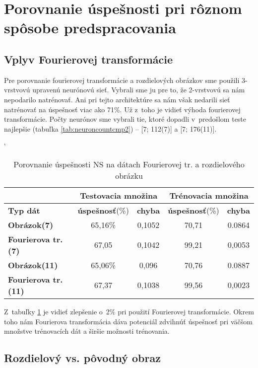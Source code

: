 \section{Porovnanie úspešnosti pri rôznom spôsobe predspracovania}

\subsection{Vplyv Fourierovej transformácie}

Pre porovnanie fourierovej transformácie a rozdielových obrázkov sme použili 3-vrstvovú upravenú neurónovú sieť. Vybrali sme ju pre to, že 2-vrstvovú sa nám nepodarilo natrénovať. Ani pri tejto architektúre sa nám však nedarili sieť natrénovať na úspešnosť viac ako 71\%. Už z~toho je vidieť výhoda fourierovej transformácie. Počty neurónov sme vybrali tie, ktoré dopadli v~predošlom teste najlepšie (tabuľka \ref{tab:neuroncountcmp2}) -- [7; 112(7)] a [7; 176(11)].

\begin{table}[htp]
\catcode` %
\centering
\begin{tabular}{|l|c|c|c|c|}
\cline{2-5}
\multicolumn{1}{l}{} & \multicolumn{2}{|c|}{\textbf{Testovacia množina}} & \multicolumn{2}{c|}{\textbf{Trénovacia množina}}\\ 
\hline
\textbf{Typ dát} & \textbf{úspešnosť}(\%) & \textbf{chyba} & \textbf{úspešnosť}(\%) & \textbf{chyba}\\ \hline
\textbf{Obrázok(7)} & 65,16\% & 0,1052 & 70,71 & 0.0864 \\ \hline
\textbf{Fourierova tr.(7)} & 67,05 & 0,1042 & 99,21 & 0,0053 \\ \hline 
\textbf{Obrázok(11)} & 65,06\% & 0,096 & 70,76 & 0.0887 \\ \hline
\textbf{Fourierova tr.(11)} & 67,37 & 0,1038 & 99,56 & 0,0023 \\ \hline
\end{tabular}
\caption{Porovnanie úspešnosti NS na dátach Fourierovej tr. a rozdielového obrázku}
\label{tab:neuraldataftcmp}
\end{table}

Z~tabuľky \ref{tab:neuraldataftcmp} je vidieť zlepšenie o~2\% pri použití Fourierovej transformácie. Okrem toho nám
Fourierova transformácia dáva potenciál zdvihnúť úspešnosť pri väčšom množstve trénovacích dát a širšie možnosti trénovania. 

\subsection{Rozdielový vs. pôvodný obraz}

